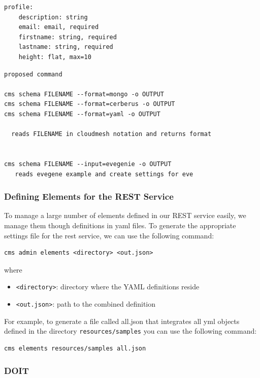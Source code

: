 \documentclass[10pt]{article}
\begin{document}
\begin{Verbatim}
profile:
    description: string
    email: email, required
    firstname: string, required
    lastname: string, required
    height: flat, max=10
\end{Verbatim}

\begin{Verbatim}
proposed command

cms schema FILENAME --format=mongo -o OUTPUT
cms schema FILENAME --format=cerberus -o OUTPUT
cms schema FILENAME --format=yaml -o OUTPUT

  reads FILENAME in cloudmesh notation and returns format


cms schema FILENAME --input=evegenie -o OUTPUT
   reads evegene example and create settings for eve
\end{Verbatim}


\subsubsection{Defining Elements for the REST Service}

To manage a large number of elements defined in our REST service
easily, we manage them though definitions in yaml files. To generate
the appropriate settings file for the rest service, we can use the
following command:

\begin{verbatim}
cms admin elements <directory> <out.json>
\end{verbatim}

where

\begin{itemize}
\item \verb+<directory>+: directory where the YAML definitions reside
\item \verb+<out.json>+: path to the combined definition
\end{itemize}

For example, to generate a file called all.json that integrates all
yml objects defined in the directory \verb+resources/samples+ you can
use the following command:

\begin{verbatim}
cms elements resources/samples all.json
\end{verbatim}

\subsubsection{DOIT}
\end{document}
